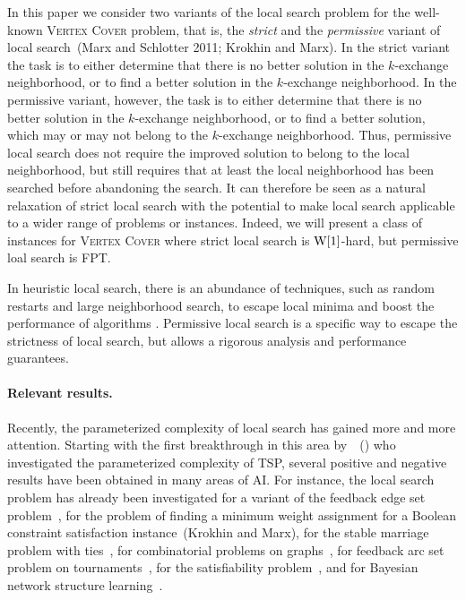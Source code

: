 \documentclass[10pt,usletter]{article}
\newcommand{\W}[1][xxxx]{\text{\normalfont W}[#1]}
\newcommand{\citex}[1]{\citeauthor{#1}~(\citeyear{#1})}
\begin{document}
In this paper we consider two variants of the local search problem for
the well-known \textsc{Vertex Cover} problem, that is, the \emph{strict} and the
\emph{permissive} variant of local
search~(Marx and Schlotter 2011; Krokhin and Marx). In the strict variant the task is to either determine that there is no better solution in
the $k$-exchange neighborhood, or to find a better solution in the $k$-exchange neighborhood.
In the permissive variant, however, the task is to either determine that there is no better solution in
the $k$-exchange neighborhood, or to find a better solution, which may
or may not belong to the $k$-exchange neighborhood.
Thus, permissive local search does not require the improved solution to belong to the
local neighborhood, but still requires that at least the local neighborhood
has been searched before abandoning the search.
It can
therefore be seen as a natural relaxation of strict local search with the
potential to make local search applicable to a wider range of problems or instances.
Indeed, we will present a class of instances for \textsc{Vertex Cover} where
strict local search is $\W[1]$-hard, but permissive loal search is FPT.

In heuristic local search, there is an abundance of techniques, such as random restarts and
large neighborhood search, to escape local minima and boost the performance of algorithms \citep{HoosStuetzle04}.
Permissive local search is a specific way to escape the strictness of local search, but
allows a rigorous analysis and performance guarantees.


\vspace{-2pt} 

\paragraph{Relevant results.} 
Recently, the parameterized complexity of local search has gained more
and more attention. Starting with the first breakthrough in this area
by~\citex{Marx08} who investigated the parameterized complexity of TSP,
several positive and negative results have been obtained in many areas
of AI. For instance, the local search problem has already been
investigated for a variant of the feedback edge set
problem~\citep{KhullerBhatiaPless03}, for the problem of finding a
minimum weight assignment for a Boolean constraint satisfaction
instance~(Krokhin and Marx), for the stable marriage problem with
ties~\citep{MarxSchlotter11}, for combinatorial problems on
graphs~\citep{FellowsRosamondFominLokshtanovSaurabhVillanger09}, for
feedback arc set problem on
tournaments~\citep{FominLokshtanovRamanSaurabh10}, for the satisfiability
problem~\citep{Szeider11b}, and for Bayesian network structure
learning~\citep{OrdyniakSzeider10}.
\end{document}

